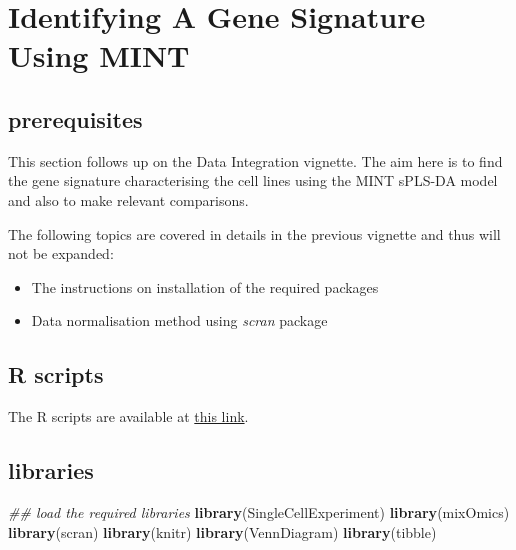 \documentclass[]{book}
\newenvironment{Shaded}{\begin{snugshade}}{\end{snugshade}}
\newcommand{\CommentTok}[1]{\textcolor[rgb]{0.56,0.35,0.01}{\textit{#1}}}
\newcommand{\KeywordTok}[1]{\textcolor[rgb]{0.13,0.29,0.53}{\textbf{#1}}}
\newcommand{\NormalTok}[1]{#1}
\providecommand{\tightlist}{%
  \setlength{\itemsep}{0pt}\setlength{\parskip}{0pt}}
\theoremstyle{definition}
\theoremstyle{definition}
\theoremstyle{definition}
\theoremstyle{remark}
\begin{document}
\hypertarget{identifying-a-gene-signature-using-mint}{%
\chapter{Identifying A Gene Signature Using
MINT}\label{identifying-a-gene-signature-using-mint}}

\hypertarget{prerequisites-1}{%
\section{prerequisites}\label{prerequisites-1}}

This section follows up on the Data Integration vignette. The aim here
is to find the gene signature characterising the cell lines using the
MINT sPLS-DA model and also to make relevant comparisons.

The following topics are covered in details in the previous vignette and
thus will not be expanded:

\begin{itemize}
\tightlist
\item
  The instructions on installation of the required packages
\item
  Data normalisation method using \emph{scran} package
\end{itemize}

\hypertarget{r-scripts-1}{%
\section{R scripts}\label{r-scripts-1}}

The R scripts are available at
\href{https://github.com/AJABADI/MINT_sPLSDA/tree/master/Rscripts}{this
link}.

\hypertarget{libraries-1}{%
\section{libraries}\label{libraries-1}}

\begin{Shaded}
\begin{Highlighting}[]
\CommentTok{## load the required libraries}
\KeywordTok{library}\NormalTok{(SingleCellExperiment)}
\KeywordTok{library}\NormalTok{(mixOmics)}
\KeywordTok{library}\NormalTok{(scran)}
\KeywordTok{library}\NormalTok{(knitr)}
\KeywordTok{library}\NormalTok{(VennDiagram)}
\KeywordTok{library}\NormalTok{(tibble)}
\end{Highlighting}
\end{Shaded}
\end{document}
